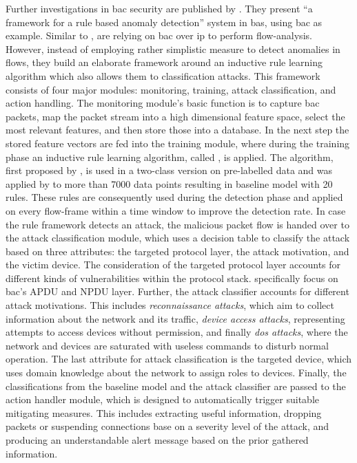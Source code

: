 Further investigations in \gls{bac} security are published by \textcite{Pan2014}. They present \enquote{a framework for a rule based anomaly detection} system in \gls{bas}, using \gls{bac} as example.
Similar to \textcite{Celeda2012}, \textcite{Pan2014} are relying on \gls{bac} over \gls{ip} to perform flow-analysis.
However, instead of employing rather simplistic measure to detect anomalies in flows, they build an elaborate framework around an inductive rule learning algorithm which also allows them to classification attacks.
This framework consists of four major modules: monitoring, training, attack classification, and action handling.
The monitoring module's basic function is to capture \gls{bac} packets, map the packet stream into a high dimensional feature space, select the most relevant features, and then store those into a database.
In the next step the stored feature vectors are fed into the training module, where during the training phase an inductive rule learning algorithm, called , is applied.
The algorithm, first proposed by \textcite{Cohen1995}, is used in a two-class version on pre-labelled data and was applied by \textcite{Pan2014} to more than 7000 data points resulting in baseline model with 20 rules.
These rules are consequently used during the detection phase and applied on every flow-frame within a time window to improve the detection rate.
In case the rule framework detects an attack, the malicious packet flow is handed over to the attack classification module, which uses a decision table to classify the attack based on three attributes: the targeted protocol layer, the attack motivation, and the victim device.
The consideration of the targeted protocol layer accounts for different kinds of vulnerabilities within the protocol stack. \textcite{Pan2014} specifically focus on \gls{bac}'s APDU and NPDU layer.
Further, the attack classifier accounts for different attack motivations. This includes \emph{reconnaissance attacks}, which aim to collect information about the network and its traffic, \emph{device access attacks}, representing attempts to access devices without permission, and finally \emph{\gls{dos} attacks}, where the network and devices are saturated with useless commands to disturb normal operation.
The last attribute for attack classification is the targeted device, which uses domain knowledge about the network to assign roles to devices.
Finally, the classifications from the baseline model and the attack classifier are passed to the action handler module, which is designed to automatically trigger suitable mitigating measures. This includes extracting useful information, dropping packets or suspending connections base on a severity level of the attack, and producing an understandable alert message based on the prior gathered information.

